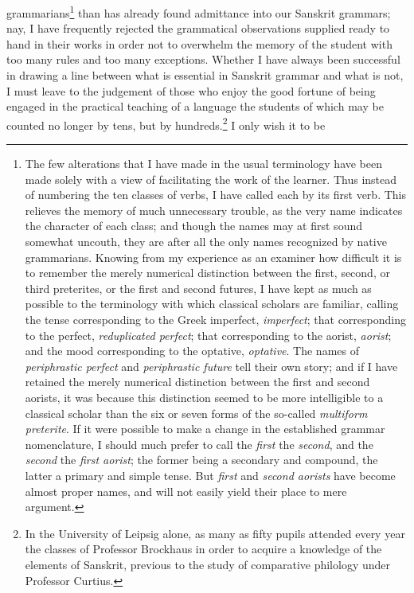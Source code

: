 grammarians\footnote{The few alterations that I have made in the usual
  terminology have been made solely with a view of facilitating the work
  of the learner. Thus instead of numbering the ten classes of verbs, I
  have called each by its first verb. This relieves the memory of much
  unnecessary trouble, as the very name indicates the character of each
  class; and though the names may at first sound somewhat uncouth, they
  are after all the only names recognized by native grammarians. Knowing
  from my experience as an examiner how difficult it is to remember the
  merely numerical distinction between the first, second, or third
  preterites, or the first and second futures, I have kept as much as
  possible to the terminology with which classical scholars are
  familiar, calling the tense corresponding to the Greek imperfect,
  \emph{imperfect}; that corresponding to the perfect,
  \emph{reduplicated perfect}; that corresponding to the aorist,
  \emph{aorist}; and the mood corresponding to the optative,
  \emph{optative}. The names of \emph{periphrastic perfect} and
  \emph{periphrastic future} tell their own story; and if I have
  retained the merely numerical distinction between the first and second
  aorists, it was because this distinction seemed to be more
  intelligible to a classical scholar than the six or seven forms of the
  so-called \emph{multiform preterite}. If it were possible to make a
  change in the established grammar nomenclature, I should much prefer
  to call the \emph{first} the \emph{second}, and the \emph{second} the
  \emph{first aorist}; the former being a secondary and compound, the
  latter a primary and simple tense. But \emph{first} and \emph{second
    aorists} have become almost proper names, and will not easily yield
  their place to mere argument.} than has already found admittance into
our Sanskrit grammars; nay, I have frequently rejected the grammatical
observations supplied ready to hand in their works in order not to
overwhelm the memory of the student with too many rules and too many
exceptions. Whether I have always been successful in drawing a line
between what is essential in Sanskrit grammar and what is not, I must
leave to the judgement of those who enjoy the good fortune of being
engaged in the practical teaching of a language the students of which
may be counted no longer by tens, but by hundreds.\footnote{In the
  University of Leipsig alone, as many as fifty pupils attended every
  year the classes of Professor Brockhaus in order to acquire a
  knowledge of the elements of Sanskrit, previous to the study of
  comparative philology under Professor Curtius.} I only wish it to be
